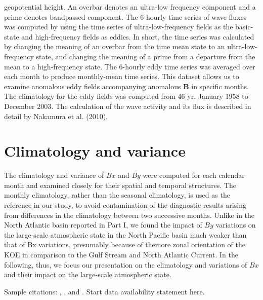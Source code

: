 \documentclass[twocol]{ametsocV5}
\begin{document}
geopotential height. An overbar denotes an ultra-low frequency
component and a prime denotes bandpassed
component. The 6-hourly time series of wave fluxes was
computed by using the time series of ultra-low-frequency
fields as the basic-state and high-frequency fields as eddies.
In short, the time series was calculated by changing the
meaning of an overbar from the time mean state to an
ultra-low-frequency state, and changing the meaning of a
prime from a departure from the mean to a high-frequency
state. The 6-hourly eddy time series was averaged over each
month to produce monthly-mean time series. This dataset
allows us to examine anomalous eddy fields accompanying
anomalous $\mathbf B$ in specific months. The climatology for
the eddy fields was computed from 46 yr, January 1958 to
December 2003. The calculation of the wave activity and
its flux is described in detail by Nakamura et al. (2010).


\section{Climatology and variance}
The climatology and variance of $Bx$ and $By$ were computed
for each calendar month and examined closely for
their spatial and temporal structures. The monthly climatology,
rather than the seasonal climatology, is used as the
reference in our study, to avoid contamination of the diagnostic
results arising from differences in the climatology
between two successive months. Unlike in the North Atlantic
basin reported in Part I, we found the impact of $By$
variations on the large-scale atmospheric state in the
North Pacific basin much weaker than that of Bx variations,
presumably because of themore zonal orientation of
the KOE in comparison to the Gulf Stream and North
Atlantic Current. In the following, thus, we focus our
presentation on the climatology and variations of $Bx$ and
their impact on the large-scale atmospheric state.

Sample citations: \citet{Becker+Schmitz2003}, \citet{Knutti2008},
and \citep{MeixnerEA2002,Kuji_Nakajima2002,EmeryEA1986}.
%
\datastatement
Start data availability statement here.
\end{document}
